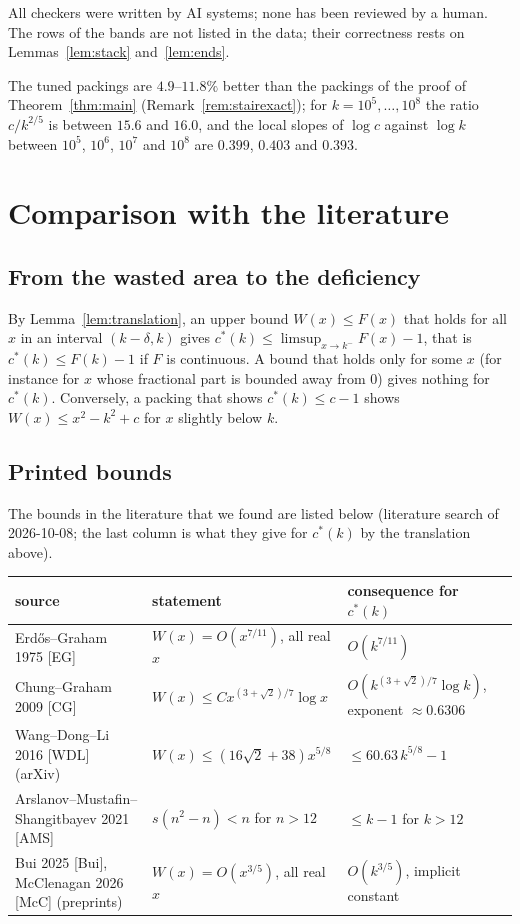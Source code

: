 \documentclass[11pt]{amsart}
\newcommand{\cs}{c^{*}}
\theoremstyle{definition}
\theoremstyle{remark}
\numberwithin{equation}{section}
\begin{document}
All checkers were written by AI systems; none has been reviewed by a human. The rows of the bands are not listed in
the data; their correctness rests on Lemmas~\ref{lem:stack} and~\ref{lem:ends}.

The tuned packings are $4.9$--$11.8\%$ better than the packings of the proof of Theorem~\ref{thm:main}
(Remark~\ref{rem:stairexact}); for $k=10^5,\dots,10^8$ the ratio $c/k^{2/5}$ is between $15.6$ and $16.0$, and the
local slopes of $\log c$ against $\log k$ between $10^5$, $10^6$, $10^7$ and $10^8$ are $0.399$, $0.403$ and $0.393$.

\section{Comparison with the literature}\label{sec:lit}

\subsection{From the wasted area to the deficiency}
By Lemma~\ref{lem:translation}, an upper bound $W(x)\le F(x)$ that holds for all $x$ in an interval $(k-\delta,k)$ gives
$\cs(k)\le\limsup_{x\to k^-}F(x)-1$, that is $\cs(k)\le F(k)-1$ if $F$ is continuous. A bound that holds only for some
$x$ (for instance for $x$ whose fractional part is bounded away from $0$) gives nothing for $\cs(k)$. Conversely, a
packing that shows $\cs(k)\le c-1$ shows $W(x)\le x^2-k^2+c$ for $x$ slightly below $k$.

\subsection{Printed bounds}
The bounds in the literature that we found are listed below (literature search of 2026-10-08; the last column is what
they give for $\cs(k)$ by the translation above).

\begin{center}
\small
\begin{tabular}{>{\raggedright}p{4.4cm}>{\raggedright}p{4.6cm}>{\raggedright\arraybackslash}p{5.6cm}}
\toprule
source & statement & consequence for $\cs(k)$\\
\midrule
Erd\H{o}s--Graham 1975 [EG] & $W(x)=O(x^{7/11})$, all real $x$ & $O(k^{7/11})$\\
Chung--Graham 2009 [CG] & $W(x)\le Cx^{(3+\sqrt2)/7}\log x$ & $O(k^{(3+\sqrt2)/7}\log k)$, exponent $\approx0.6306$\\
Wang--Dong--Li 2016 [WDL] (arXiv) & $W(x)\le(16\sqrt2+38)x^{5/8}$ & $\le60.63\,k^{5/8}-1$\\
Arslanov--Mustafin--Shangitbayev 2021 [AMS] & $s(n^2-n)<n$ for $n>12$ & $\le k-1$ for $k>12$\\
Bui 2025 [Bui], McClenagan 2026 [McC] (preprints) & $W(x)=O(x^{3/5})$, all real $x$ & $O(k^{3/5})$, implicit constant\\
\bottomrule
\end{tabular}
\end{center}
\end{document}
